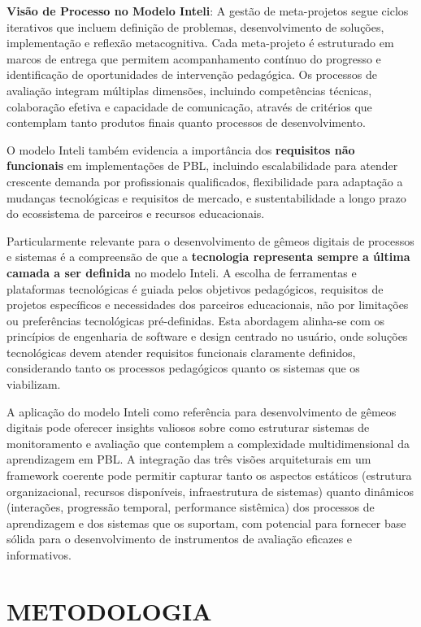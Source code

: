 \documentclass[12pt,a4paper]{article}
\begin{document}
\textbf{Visão de Processo no Modelo Inteli}: A gestão de meta-projetos segue ciclos iterativos que incluem definição de problemas, desenvolvimento de soluções, implementação e reflexão metacognitiva. Cada meta-projeto é estruturado em marcos de entrega que permitem acompanhamento contínuo do progresso e identificação de oportunidades de intervenção pedagógica. Os processos de avaliação integram múltiplas dimensões, incluindo competências técnicas, colaboração efetiva e capacidade de comunicação, através de critérios que contemplam tanto produtos finais quanto processos de desenvolvimento.

O modelo Inteli também evidencia a importância dos \textbf{requisitos não
  funcionais} em implementações de PBL, incluindo escalabilidade para atender
crescente demanda por profissionais qualificados, flexibilidade para adaptação
a mudanças tecnológicas e requisitos de mercado, e sustentabilidade a longo
prazo do ecossistema de parceiros e recursos educacionais.

Particularmente relevante para o desenvolvimento de gêmeos digitais de
processos e sistemas é a compreensão de que a \textbf{tecnologia representa
  sempre a última camada a ser definida} no modelo Inteli. A escolha de
ferramentas e plataformas tecnológicas é guiada pelos objetivos pedagógicos,
requisitos de projetos específicos e necessidades dos parceiros educacionais,
não por limitações ou preferências tecnológicas pré-definidas. Esta abordagem
alinha-se com os princípios de engenharia de software e design centrado no
usuário, onde soluções tecnológicas devem atender requisitos funcionais
claramente definidos, considerando tanto os processos pedagógicos quanto os
sistemas que os viabilizam.

A aplicação do modelo Inteli como referência para desenvolvimento de gêmeos
digitais pode oferecer insights valiosos sobre como
estruturar sistemas de monitoramento e avaliação que contemplem a complexidade
multidimensional da aprendizagem em PBL. A integração das três visões
arquiteturais em um framework coerente pode permitir capturar tanto os aspectos
estáticos (estrutura organizacional, recursos disponíveis, infraestrutura de
sistemas) quanto dinâmicos (interações, progressão temporal, performance
sistêmica) dos processos de aprendizagem e dos sistemas que os suportam, com
potencial para fornecer base sólida para o desenvolvimento de instrumentos de
avaliação eficazes e informativos.

\section{METODOLOGIA}
\end{document}

